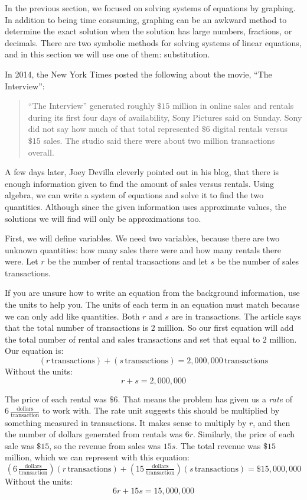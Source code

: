 \documentclass[nooutcomes]{ximera}
\begin{document}
      In the previous section,
      we focused on solving systems of equations by graphing.
      In addition to being time consuming,
      graphing can be an awkward method to determine the exact solution
      when the solution has large numbers, fractions, or decimals.
      There are two symbolic methods for solving systems of linear equations,
      and in this section we will use one of them:
      substitution.
\begin{example}
   In 2014, the New York Times
     posted the following about the movie, ``The Interview'':
\begin{quote}
 ``The Interview'' generated roughly $\$15$ million in online sales and rentals during its first four days of availability, Sony Pictures said on Sunday.
  Sony did not say how much of that total represented $\$6$ digital rentals versus $\$15$ sales.
          The studio said there were about two million transactions overall.
\end{quote}

     A few days later, Joey Devilla cleverly pointed out in his blog, that there is enough information given to find the amount of sales versus rentals.
        Using algebra,
        we can write a system of equations and solve it to find the two quantities.
        Although since the given information uses approximate values,
        the solutions we will find will only be approximations too.

    First, we will define variables.
        We need two variables, because there are two unknown quantities:
        how many sales there were and how many rentals there were.
        Let $r$ be the number of rental transactions and let $s$ be the number of sales transactions.

If you are unsure how to write an equation from the background information,
        use the units to help you.
        The units of each term in an equation must match because we can only add like quantities.
        Both $r$ and $s$ are in transactions.
        The article says that the total number of transactions is $2$ million.
        So our first equation will add the total number of rental and sales transactions and set that equal to $2$ million.
        Our equation is:
\[
  (r\,\text{transactions})+(s\,\text{transactions})=2{,}000{,}000\,\text{transactions}
\]
 Without the units:
\[
r+s=2{,}000{,}000
\]

  The price of each rental was $\$6$.
        That means the problem has given us a \textit{rate}
        of $6\,\frac{\text{dollars}}{\text{transaction}}$ to work with.
        The rate unit suggests this should be multiplied by something measured in transactions.
        It makes sense to multiply by $r$,
        and then the number of dollars generated from rentals was $6r$.
        Similarly, the price of each sale was $\$15$,
        so the revenue from sales was $15s$.
        The total revenue was $\$15$ million,
        which we can represent with this equation:
\[
          \left(6\,\tfrac{\text{dollars}}{\text{transaction}}\right)(r\,\text{transactions})+\left(15\,\tfrac{\text{dollars}}{\text{transaction}}\right)(s\,\text{transactions})=\$15{,}000{,}000
\]
        Without the units:
    \[
          6r+15s=15{,}000{,}000
     \]


\end{example}
\end{document}
